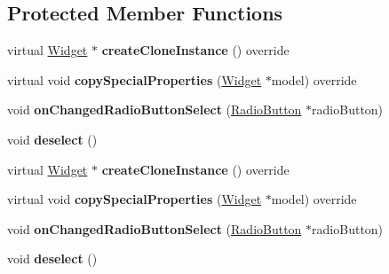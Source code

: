 \subsection*{Protected Member Functions}
\begin{DoxyCompactItemize}
\item 
\mbox{\label{classui_1_1RadioButtonGroup_a0df8158558b966d1e7644e6569e09f2a}} 
virtual \hyperlink{classui_1_1Widget}{Widget} $\ast$ {\bfseries create\+Clone\+Instance} () override
\item 
\mbox{\label{classui_1_1RadioButtonGroup_a15d24a00a44d69f617ec30d5ac751275}} 
virtual void {\bfseries copy\+Special\+Properties} (\hyperlink{classui_1_1Widget}{Widget} $\ast$model) override
\item 
\mbox{\label{classui_1_1RadioButtonGroup_aa17253d600164140be53c4df9916a67c}} 
void {\bfseries on\+Changed\+Radio\+Button\+Select} (\hyperlink{classui_1_1RadioButton}{Radio\+Button} $\ast$radio\+Button)
\item 
\mbox{\label{classui_1_1RadioButtonGroup_ab142e8843d4f7f6e331d8b772aef29e7}} 
void {\bfseries deselect} ()
\item 
\mbox{\label{classui_1_1RadioButtonGroup_a66bce4aa36965a22d7819c4d4a4d65f3}} 
virtual \hyperlink{classui_1_1Widget}{Widget} $\ast$ {\bfseries create\+Clone\+Instance} () override
\item 
\mbox{\label{classui_1_1RadioButtonGroup_ab6d6fed67481d8ad2f204969c683c7e0}} 
virtual void {\bfseries copy\+Special\+Properties} (\hyperlink{classui_1_1Widget}{Widget} $\ast$model) override
\item 
\mbox{\label{classui_1_1RadioButtonGroup_aa17253d600164140be53c4df9916a67c}} 
void {\bfseries on\+Changed\+Radio\+Button\+Select} (\hyperlink{classui_1_1RadioButton}{Radio\+Button} $\ast$radio\+Button)
\item 
\mbox{\label{classui_1_1RadioButtonGroup_ab142e8843d4f7f6e331d8b772aef29e7}} 
void {\bfseries deselect} ()
\end{DoxyCompactItemize}
